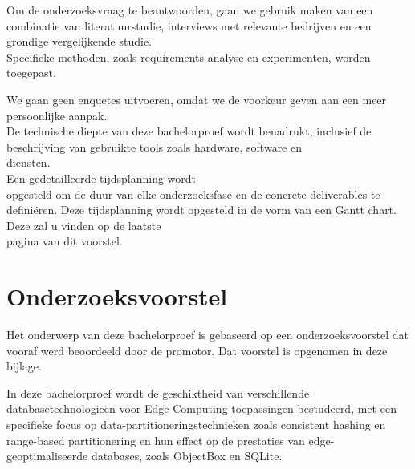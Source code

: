 \documentclass[dutch,dit,thesis]{hogentreport}
\begin{document}





%
%

Om de onderzoeksvraag te beantwoorden, gaan we gebruik maken van een combinatie van literatuurstudie,
 interviews met relevante bedrijven en een grondige vergelijkende studie. \\
 
Specifieke methoden, zoals requirements-analyse en experimenten, worden toegepast.

We gaan geen enquetes uitvoeren, omdat we de voorkeur geven aan een meer persoonlijke aanpak. \\
 
De technische diepte van deze bachelorproef wordt benadrukt,
 inclusief de beschrijving van gebruikte tools zoals hardware, software en \\ diensten. \\

Een gedetailleerde tijdsplanning wordt \\ opgesteld om de duur van elke onderzoeksfase en de concrete deliverables te definiëren.
Deze tijdsplanning wordt opgesteld in de vorm van een Gantt chart. Deze zal u vinden op de laatste \\ pagina van dit voorstel.





\appendix

\chapter{Onderzoeksvoorstel}

Het onderwerp van deze bachelorproef is gebaseerd op een onderzoeksvoorstel dat vooraf werd beoordeeld door de promotor. Dat voorstel is opgenomen in deze bijlage.


In deze bachelorproef wordt de geschiktheid van verschillende databasetechnologieën voor Edge Computing-toepassingen bestudeerd,
  met een specifieke focus op data-partitioneringstechnieken zoals consistent hashing en range-based partitionering en hun effect op de prestaties van edge-geoptimaliseerde databases, zoals ObjectBox en SQLite.
\end{document}
